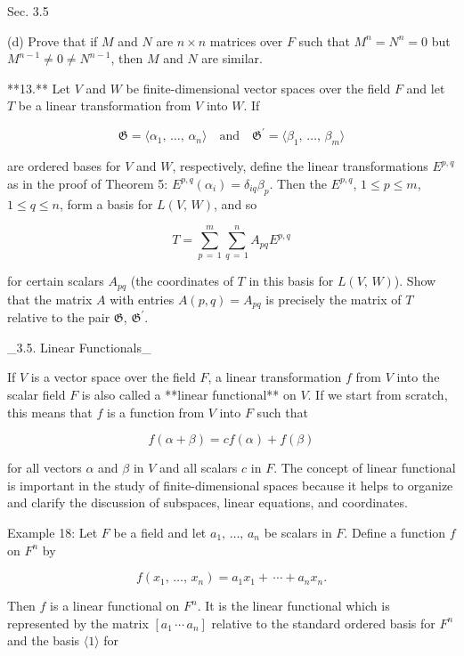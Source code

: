 Sec. 3.5

(d) Prove that if \(M\) and \(N\) are \(n\times n\) matrices over \(F\) such that \(M^{n}=N^{n}=0\) but \(M^{n-1}\neq 0\neq N^{n-1}\), then \(M\) and \(N\) are similar.

**13.** Let \(V\) and \(W\) be finite-dimensional vector spaces over the field \(F\) and let \(T\) be a linear transformation from \(V\) into \(W\). If

\[\mathfrak{G}=\langle\alpha_{1},\,\ldots,\,\alpha_{n}\rangle\quad\mbox{and} \quad\mathfrak{G}^{\prime}=\langle\beta_{1},\,\ldots,\,\beta_{m}\rangle\]

are ordered bases for \(V\) and \(W\), respectively, define the linear transformations \(E^{p,q}\) as in the proof of Theorem 5: \(E^{p,q}(\alpha_{i})=\delta_{iq}\beta_{p}\). Then the \(E^{p,q}\), \(1\leq p\leq m\), \(1\leq q\leq n\), form a basis for \(L(V,\,W)\), and so

\[T=\sum_{p\,=\,1}^{m}\sum_{q\,=\,1}^{n}A_{pq}E^{p,q}\]

for certain scalars \(A_{pq}\) (the coordinates of \(T\) in this basis for \(L(V,\,W)\)). Show that the matrix \(A\) with entries \(A(p,q)=A_{pq}\) is precisely the matrix of \(T\) relative to the pair \(\mathfrak{G}\), \(\mathfrak{G}^{\prime}\).

_3.5. Linear Functionals_

If \(V\) is a vector space over the field \(F\), a linear transformation \(f\) from \(V\) into the scalar field \(F\) is also called a **linear functional** on \(V\). If we start from scratch, this means that \(f\) is a function from \(V\) into \(F\) such that

\[f(\alpha+\beta)=cf(\alpha)+f(\beta)\]

for all vectors \(\alpha\) and \(\beta\) in \(V\) and all scalars \(c\) in \(F\). The concept of linear functional is important in the study of finite-dimensional spaces because it helps to organize and clarify the discussion of subspaces, linear equations, and coordinates.

Example 18: Let \(F\) be a field and let \(a_{1},\,\ldots,\,a_{n}\) be scalars in \(F\). Define a function \(f\) on \(F^{n}\) by

\[f(x_{1},\,\ldots,\,x_{n})=a_{1}x_{1}+\,\cdots+a_{n}x_{n}.\]

Then \(f\) is a linear functional on \(F^{n}\). It is the linear functional which is represented by the matrix \([a_{1}\,\cdots\,a_{n}]\) relative to the standard ordered basis for \(F^{n}\) and the basis \(\langle 1\rangle\) for 